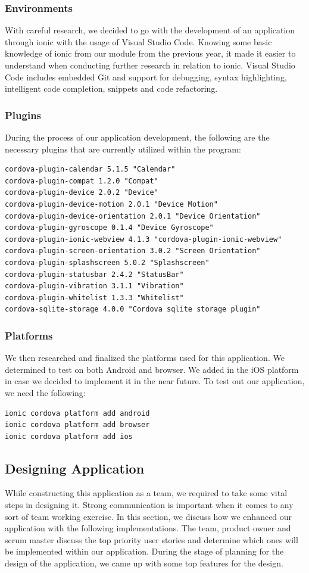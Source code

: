 \documentclass[a4paper,12pt]{report}
\begin{document}
\subsubsection{Environments}
With careful research, we decided to go with the development of an application through ionic with the usage of Visual Studio Code. Knowing some basic knowledge of ionic from our module from the previous year, it made it easier to understand when conducting further research in relation to ionic. Visual Studio Code includes embedded Git and support for debugging, syntax highlighting, intelligent code completion, snippets and code refactoring.

\subsubsection{Plugins}
During the process of our application development, the following are the necessary plugins that are currently utilized within the program:

\begin{lstlisting}
cordova-plugin-calendar 5.1.5 "Calendar"
cordova-plugin-compat 1.2.0 "Compat"
cordova-plugin-device 2.0.2 "Device"
cordova-plugin-device-motion 2.0.1 "Device Motion"
cordova-plugin-device-orientation 2.0.1 "Device Orientation"
cordova-plugin-gyroscope 0.1.4 "Device Gyroscope"
cordova-plugin-ionic-webview 4.1.3 "cordova-plugin-ionic-webview"
cordova-plugin-screen-orientation 3.0.2 "Screen Orientation"
cordova-plugin-splashscreen 5.0.2 "Splashscreen"
cordova-plugin-statusbar 2.4.2 "StatusBar"
cordova-plugin-vibration 3.1.1 "Vibration"
cordova-plugin-whitelist 1.3.3 "Whitelist"
cordova-sqlite-storage 4.0.0 "Cordova sqlite storage plugin"
\end{lstlisting} 

\subsubsection{Platforms}
We then researched and finalized the platforms used for this application. We determined to test on both Android and browser. We added in the iOS platform in case we decided to implement it in the near future. To test out our application, we need the following:
\begin{lstlisting}
ionic cordova platform add android
ionic cordova platform add browser
ionic cordova platform add ios
\end{lstlisting}

\subsection{Designing Application}
While constructing this application as a team, we required to take some vital steps in designing it. Strong communication is important when it comes to any sort of team working exercise. In this section, we discuss how we enhanced our application with the following implementations.
The team, product owner and scrum master discuss the top priority user stories and determine which ones will be implemented within our application. During the stage of planning for the design of the application, we came up with some top features for the design.
\end{document}
